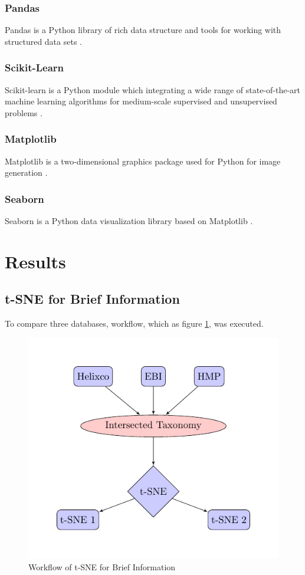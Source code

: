 \documentclass[a4paper]{article}
\begin{document}
            \subsubsection{Pandas}
                Pandas is a Python library of rich data structure and tools for working with structured data sets \cite{pandas1}.

            \subsubsection{Scikit-Learn}
                Scikit-learn is a Python module which integrating a wide range of state-of-the-art machine learning algorithms for medium-scale supervised and unsupervised problems \cite{sklearn1}.

            \subsubsection{Matplotlib}
                Matplotlib is a two-dimensional graphics package used for Python for image generation \cite{matplotlib1}.

            \subsubsection{Seaborn}
                Seaborn is a Python data visualization library based on Matplotlib \cite{seaborn1}.

    \section{Results}
        \subsection{t-SNE for Brief Information}
            To compare three databases, workflow, which as figure \ref{fig:workflow-brief}, was executed.

            \begin{figure}[p]
                \centering
                \includegraphics[width=0.3 \linewidth]{figures/tikz/brief.pdf}
                \caption{Workflow of t-SNE for Brief Information}
                \label{fig:workflow-brief}
            \end{figure}
\end{document}

